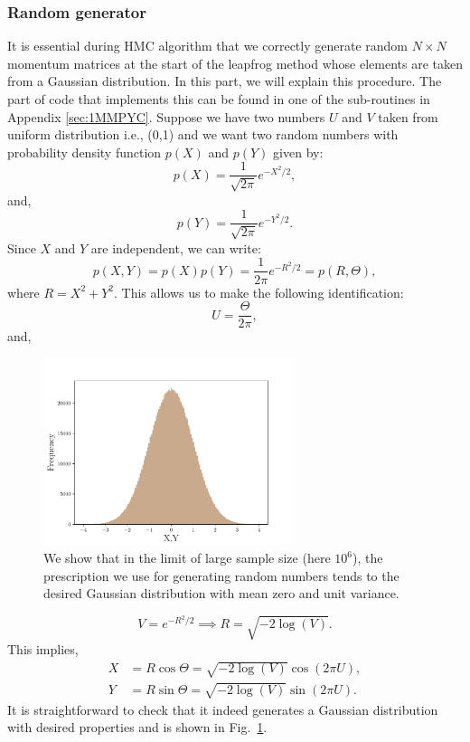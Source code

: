 \documentclass[letter,11pt]{article}
\begin{document}
\subsubsection{Random generator}  
It is essential during HMC algorithm that we correctly generate random 
$N \times N$ momentum matrices at the start of the leapfrog method whose elements are taken from a Gaussian distribution. 
In this part, we will explain this procedure. The part of code that implements this can be found in one of the sub-routines in 
Appendix \ref{sec:1MMPYC}.  Suppose we have two numbers $U$ and $V$ taken from uniform distribution i.e., (0,1) and we 
want two random numbers with probability density function $p(X)$ and $p(Y)$ given by:
\begin{equation}
	p(X) = \frac{1}{\sqrt{2\pi}} e^{-X^2/2}, 
\end{equation}
and, 
\begin{equation}
	p(Y) = \frac{1}{\sqrt{2\pi}} e^{-Y^2/2} .
\end{equation}
Since $X$ and $Y$ are independent, we can write:
\begin{equation}
	p(X,Y) = p(X) p(Y) = \frac{1}{2\pi} e^{-R^2/2} = p(R, \Theta),  
\end{equation}
where $R = X^2 + Y^2$. This allows us to make the following identification:
\begin{equation}
	U = \frac{\Theta}{2\pi}, 
\end{equation}
and, 
\begin{figure}[htbp] 
	\centering 
	\includegraphics[width=0.65\textwidth]{figs/testRN.pdf}
	\caption{\label{fig:RN}We show that in the limit of large sample size (here $10^6$), the prescription we use for 
	generating random numbers tends to the desired Gaussian distribution with mean zero and unit variance.}
\end{figure}
\begin{equation}
	V = e^{-R^2/2} \implies R = \sqrt{-2 \log(V)}. 
\end{equation}
This implies, 
\begin{align}
	X &= R \cos \Theta = \sqrt{-2 \log(V)} \cos(2 \pi U), \\
	Y &= R \sin \Theta = \sqrt{-2 \log(V)} \sin(2 \pi U).
\end{align}
It is straightforward to check that it indeed generates a Gaussian distribution with desired properties and is 
shown in Fig.~\ref{fig:RN}.
\end{document}
